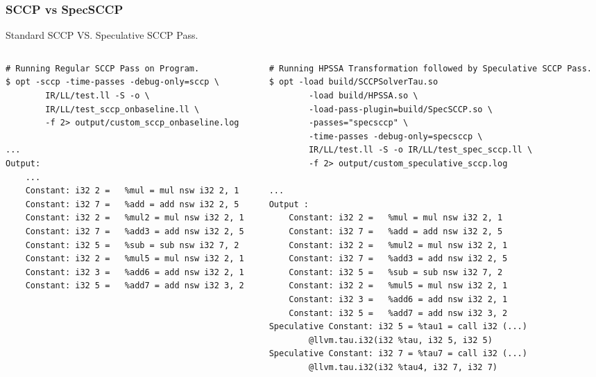 \documentclass[aspectratio=169, compress]{beamer}
\begin{document}
\begin{frame}[fragile]
	\frametitle{SCCP vs SpecSCCP}
	Standard SCCP VS. Speculative SCCP Pass.
\begin{columns}
	\begin{column}{0.4\textwidth}
		\begin{verbatim}
# Running Regular SCCP Pass on Program.
$ opt -sccp -time-passes -debug-only=sccp \
		IR/LL/test.ll -S -o \
		IR/LL/test_sccp_onbaseline.ll \
		-f 2> output/custom_sccp_onbaseline.log

...
Output:
	...
	Constant: i32 2 =   %mul = mul nsw i32 2, 1
	Constant: i32 7 =   %add = add nsw i32 2, 5
	Constant: i32 2 =   %mul2 = mul nsw i32 2, 1
	Constant: i32 7 =   %add3 = add nsw i32 2, 5
	Constant: i32 5 =   %sub = sub nsw i32 7, 2
	Constant: i32 2 =   %mul5 = mul nsw i32 2, 1
	Constant: i32 3 =   %add6 = add nsw i32 2, 1
	Constant: i32 5 =   %add7 = add nsw i32 3, 2
	
	
	
	
		\end{verbatim}
	\end{column}
	\begin{column}{0.5\textwidth}  
		\begin{verbatim}
# Running HPSSA Transformation followed by Speculative SCCP Pass.
$ opt -load build/SCCPSolverTau.so 
		-load build/HPSSA.so \
		-load-pass-plugin=build/SpecSCCP.so \
		-passes="specsccp" \
		-time-passes -debug-only=specsccp \
		IR/LL/test.ll -S -o IR/LL/test_spec_sccp.ll \
		-f 2> output/custom_speculative_sccp.log
	
...
Output :
	Constant: i32 2 =   %mul = mul nsw i32 2, 1
	Constant: i32 7 =   %add = add nsw i32 2, 5
	Constant: i32 2 =   %mul2 = mul nsw i32 2, 1
	Constant: i32 7 =   %add3 = add nsw i32 2, 5
	Constant: i32 5 =   %sub = sub nsw i32 7, 2
	Constant: i32 2 =   %mul5 = mul nsw i32 2, 1
	Constant: i32 3 =   %add6 = add nsw i32 2, 1
	Constant: i32 5 =   %add7 = add nsw i32 3, 2
Speculative Constant: i32 5 = %tau1 = call i32 (...) 
		@llvm.tau.i32(i32 %tau, i32 5, i32 5)
Speculative Constant: i32 7 = %tau7 = call i32 (...) 
		@llvm.tau.i32(i32 %tau4, i32 7, i32 7)
		\end{verbatim}
	\end{column}
\end{columns}
\end{frame}
\end{document}
